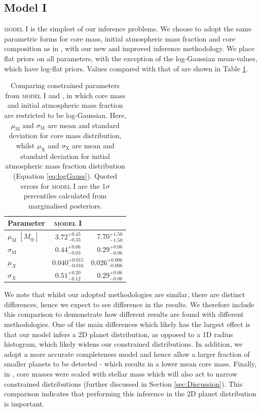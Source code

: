 \documentclass[fleqn,usenatbib]{mnras}
\begin{document}
\subsection{Model I} \label{sec:ModelI}
\textsc{model I} is the simplest of our inference problems. We choose to adopt the same parametric forms for core mass, initial atmospheric mass fraction and core composition as in \cite{Wu2019}, with our new and improved inference methodology.  We place flat priors on all parameters, with the exception of the log-Gaussian mean-values, which have log-flat priors. Values compared with that of \cite{Wu2019} are shown in Table \ref{tab:modelI}.
\begin{table}
	\centering
	\caption{Comparing constrained parameters from \textsc{model I} and \protect\cite{Wu2019}, in which core mass and initial atmospheric mass fraction are restricted to be log-Gaussian. Here, $\mu_\text{M}$ and $\sigma_\text{M}$ are mean and standard deviation for core mass distribution, whilst $\mu_\text{X}$ and $\sigma_\text{X}$ are mean and standard deviation for initial atmospheric mass fraction distribution (Equation \ref{eq:logGauss}). Quoted errors for \textsc{model I} are the 1$\sigma$ percentiles calculated from marginalised posteriors.}
	\def\arraystretch{1.5}
	\begin{tabular}{ lcr } %
		\hline
		Parameter & \textsc{model I} & \cite{Wu2019}\\
		\hline
		$\mu_\text{M} \; [M_\oplus]$ & $3.72^{+0.45}_{-0.33}$ & $7.70^{+1.50}_{-1.50}$\\
		$\sigma_\text{M}$ & $0.44^{+0.06}_{-0.03}$ & $0.29^{+0.06}_{-0.06}$\\
		$\mu_X$ & $0.040^{+0.015}_{-0.016}$ & $0.026^{+0.006}_{-0.006}$\\
		$\sigma_X$ & $0.51^{+0.20}_{-0.12}$ & $0.29^{+0.06}_{-0.06}$\\
		\hline
	\end{tabular}
	\label{tab:modelI}
\end{table}
We note that whilst our adopted methodologies are similar, there are distinct differences, hence we expect to see difference in the results. We therefore include this comparison to demonstrate how different results are found with different methodologies. One of the main differences which likely has the largest effect is that our model infers a 2D planet distribution, as opposed to a 1D radius histogram, which likely widens our constrained distributions. In addition, we adopt a more accurate completeness model and hence allow a larger fraction of smaller planets to be detected - which results in a lower mean core mass. Finally, in \cite{Wu2019}, core masses were scaled with stellar mass which will also act to narrow constrained distributions (further discussed in Section \ref{sec:Discussion}). This comparison indicates that performing this inference in the 2D planet distribution is important. 
\end{document}

